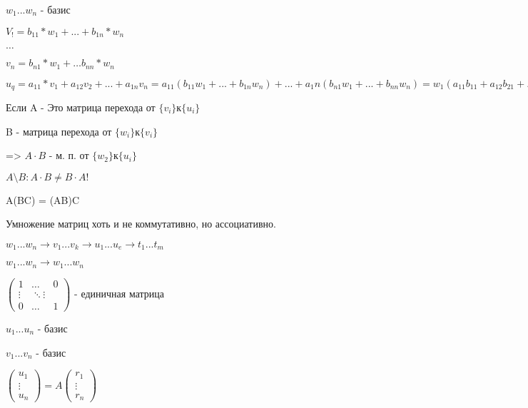 $w_1 ... w_n$ - базис

$V_! = b_{11} * w_1 + ... + b_{1n} * w_n$

$\dots$

$v_n = b_{n1} * w_1 + \dots b_{nn} * w_n$



$u_q = a_{11} * v_1 + a_{12} v_2 + ... + a_{1n} v_n = a_{11} (b_{11} w_1 + ... + b_{1n} w_n) + ... + a_1n (b_{n1} w_1 + ... + b_{nn} w_n) = w_1 (a_{11} b_{11} + a_{12} b_{21} + ... + a_{1n} b_{n1}) . \dots$

\begin{theorem}
    Если A - Это матрица перехода от $\{v_i\} к \{u_i\}$

    B - матрица перехода от $\{w_i\} к \{v_i\}$

    => $A \cdot B$ - м. п. от $\{w_2\} к \{u_i\}$
\end{theorem}

$A \setminus B: A \cdot B \neq B \cdot A !$

\begin{theorem}
    
    A(BC) = (AB)C 


    Умножение матриц хоть и не коммутативно, но ассоциативно.

\end{theorem}

$w_1 ... w_n \to v_1 ... v_k \to u_1 ... u_e \to t_1 ... t_m$


$w_1 ... w_n \to w_1 ... w_n$

$\left(
        \begin{array}{ccc}
            1 & \ldots & 0\\
            \vdots & \ddots \vdots\\
            0 & \ldots & 1
        \end{array}
        \right)$ - единичная матрица

$u_1 ... u_n$ - базис

$v_1 ... v_n$ - базис

$\left(
        \begin{array}{c}
            u_1\\
            \vdots\\
            u_n
        \end{array}
        \right) = A \left(
            \begin{array}{c}
                r_1\\
                \vdots\\
                r_n
            \end{array}
            \right)$


